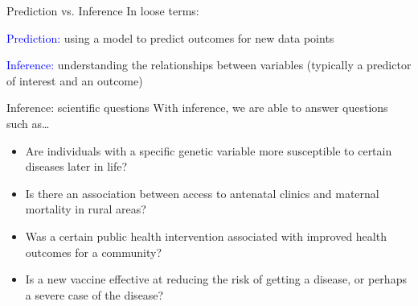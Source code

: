 \documentclass[10pt,t]{beamer}
\begin{document}
\begin{frame}{Prediction vs. Inference}
In loose terms:
\vspace{0.3cm}

\textcolor{blue}{Prediction:} using a model to predict outcomes for new data points

\vspace{0.3cm}

\textcolor{blue}{Inference:} understanding the relationships between variables (typically a predictor of interest and an outcome)
\end{frame}

\begin{frame}{Inference: scientific questions}
With inference, we are able to answer questions such as\dots

\vspace{0.3cm}

\begin{itemize}
	\item Are individuals with a specific genetic variable more susceptible to certain diseases later in life?
	\medskip
	
	\item Is there an association between access to antenatal clinics and maternal mortality in rural areas?
	
	\medskip
	
	\item Was a certain public health intervention associated with improved health outcomes for a community?
	\medskip
	
	\item Is a new vaccine effective at reducing the risk of getting a disease, or perhaps a severe case of the disease?
\end{itemize}

\end{frame}
\end{document}
